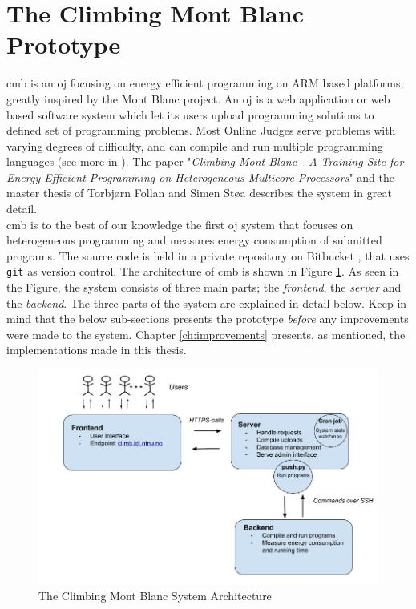 \section{The Climbing Mont Blanc Prototype}
\label{sec:cmb}
\gls{cmb} is an \gls{oj} focusing on energy efficient programming on ARM based platforms, greatly inspired by the Mont Blanc project. An \gls{oj} is a web application or web based software system which let its users upload programming solutions to defined set of programming problems. Most Online Judges serve problems with varying degrees of difficulty, and can compile and run multiple programming languages (see more in ). The paper "\textit{Climbing Mont Blanc - A Training Site for Energy Efficient Programming on Heterogeneous Multicore Processors}" \cite{a:CMB} and the master thesis of Torbjørn Follan and Simen Støa \cite{mt:T&S} describes the system in great detail. \\

\gls{cmb} is to the best of our knowledge the first \gls{oj} system that focuses on heterogeneous programming and measures energy consumption of submitted programs. The source code is held in a private repository on Bitbucket \cite{BITBUCKET}, that uses \texttt{git} \cite{GIT} as version control. The architecture of \gls{cmb} is shown in Figure \ref{fig:cmb_arch}. As seen in the Figure, the system consists of three main parts; the \textit{frontend}, the \textit{server} and the \textit{backend}. The three parts of the system are explained in detail below. Keep in mind that the below sub-sections presents the prototype \textit{before} any improvements were made to the system. Chapter \ref{ch:improvements} presents, as mentioned, the implementations made in this thesis.

\begin{figure}
  \includegraphics[width=1.0\textwidth]{figs/cmb_arch.jpg}
  \caption[The Climbing Mont Blanc System Architecture]{The Climbing Mont Blanc System Architecture}
  \label{fig:cmb_arch}
\end{figure}

